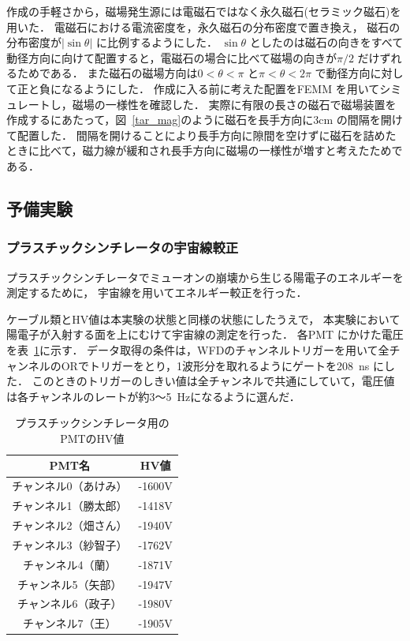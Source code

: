 作成の手軽さから，磁場発生源には電磁石ではなく永久磁石(セラミック磁石)を用いた．
電磁石における電流密度を，永久磁石の分布密度で置き換え，
磁石の分布密度が$|\sin\theta|$ に比例するようにした．
$\sin\theta$ としたのは磁石の向きをすべて動径方向に向けて配置すると，電磁石の場合に比べて磁場の向きが$\pi/2$ だけずれるためである．
また磁石の磁場方向は$0<\theta<\pi$ と$\pi<\theta<2\pi$ で動径方向に対して正と負になるようにした．
作成に入る前に考えた配置をFEMM を用いてシミュレートし，磁場の一様性を確認した．
実際に有限の長さの磁石で磁場装置を作成するにあたって，図~\ref{tar_mag}のように磁石を長手方向に$3\mathrm{cm}$ の間隔を開けて配置した．
間隔を開けることにより長手方向に隙間を空けずに磁石を詰めたときに比べて，磁力線が緩和され長手方向に磁場の一様性が増すと考えたためである．

\newpage
\subsection{予備実験}
\subsubsection{プラスチックシンチレータの宇宙線較正}
プラスチックシンチレータでミューオンの崩壊から生じる陽電子のエネルギーを測定するために， 宇宙線を用いてエネルギー較正を行った．

ケーブル類とHV値は本実験の状態と同様の状態にしたうえで，
本実験において陽電子が入射する面を上にむけて宇宙線の測定を行った．
各PMT にかけた電圧を表~\ref{PS_PMT_HV}に示す．
データ取得の条件は，WFDのチャンネルトリガーを用いて全チャンネルのORでトリガーをとり，1波形分を取れるようにゲートを208~ns にした．
このときのトリガーのしきい値は全チャンネルで共通にしていて，電圧値は各チャンネルのレートが約3〜5~Hzになるように選んだ．
 \begin{table}[H]
  \caption{プラスチックシンチレータ用のPMTのHV値}
  \label{PS_PMT_HV}
  \begin{center}
   \begin{tabular}{cc}\toprule
    PMT名&HV値 \\ \hline
    チャンネル0（あけみ）&-1600V \\
    チャンネル1（勝太郎）&-1418V \\
    チャンネル2（畑さん）&-1940V \\
    チャンネル3（紗智子）&-1762V \\
    チャンネル4（蘭）  &-1871V \\
    チャンネル5（矢部） &-1947V \\
    チャンネル6（政子） &-1980V \\
    チャンネル7（王）  &-1905V \\ \bottomrule
   \end{tabular} 
  \end{center}
 \end{table}%

